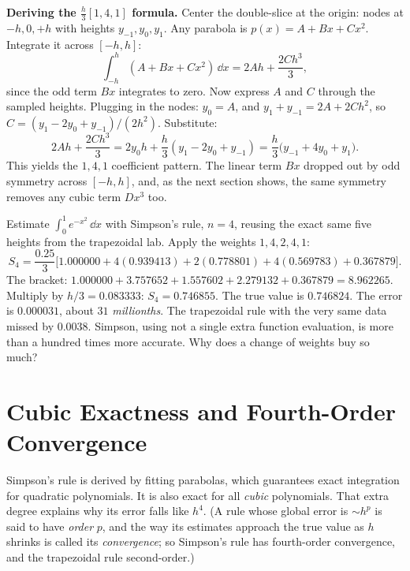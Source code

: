 \begin{whybox}
\textbf{Deriving the $\tfrac{h}{3}[1,4,1]$ formula.} Center the double-slice at the origin: nodes at $-h, 0, +h$ with heights $y_{-1}, y_0, y_1$. Any parabola is $p(x) = A + Bx + Cx^2$. Integrate it across $[-h,h]$:
\[
\int_{-h}^{h} (A + Bx + Cx^2)\,\dd x = 2Ah + \frac{2Ch^3}{3},
\]
since the odd term $Bx$ integrates to zero. Now express $A$ and $C$ through the sampled heights. Plugging in the nodes: $y_0 = A$, and $y_1 + y_{-1} = 2A + 2Ch^2$, so $C = (y_1 - 2y_0 + y_{-1})/(2h^2)$. Substitute:
\[
2Ah + \frac{2Ch^3}{3} = 2y_0 h + \frac{h}{3}(y_1 - 2y_0 + y_{-1}) = \frac{h}{3}\big(y_{-1} + 4y_0 + y_1\big).
\]
This yields the $1,4,1$ coefficient pattern. The linear term $Bx$
dropped out by odd symmetry across $[-h,h]$, and, as the next section shows, the
same symmetry removes any cubic term $Dx^3$ too.
\end{whybox}

\begin{labbox}
Estimate $\int_0^1 e^{-x^2}\,\dd x$ with Simpson's rule, $n = 4$, reusing the exact same five heights from the trapezoidal lab. Apply the weights $1,4,2,4,1$:
\[
S_4 = \frac{0.25}{3}\Big[1.000000 + 4(0.939413) + 2(0.778801) + 4(0.569783) + 0.367879\Big].
\]
The bracket: $1.000000 + 3.757652 + 1.557602 + 2.279132 + 0.367879 = 8.962265$. Multiply by $h/3 = 0.083333$: $S_4 = 0.746855$. The true value is $0.746824$. The error is $0.000031$, about $31$ \emph{millionths}. The trapezoidal rule with the very same data missed by $0.0038$. Simpson, using not a single extra function evaluation, is more than a hundred times more accurate. Why does a change of weights buy so much?
\end{labbox}

\section{Cubic Exactness and Fourth-Order Convergence}
\label{ch27:whysimpson}

Simpson's rule is derived by fitting parabolas, which guarantees exact integration
for quadratic polynomials. It is also exact for all \emph{cubic}
polynomials. That extra degree explains why its error falls like $h^4$. (A rule whose
global error is $\sim h^p$ is said to have \emph{order} $p$, and the way its estimates
approach the true value as $h$ shrinks is called its \emph{convergence}; so Simpson's rule
has fourth-order convergence, and the trapezoidal rule second-order.)

